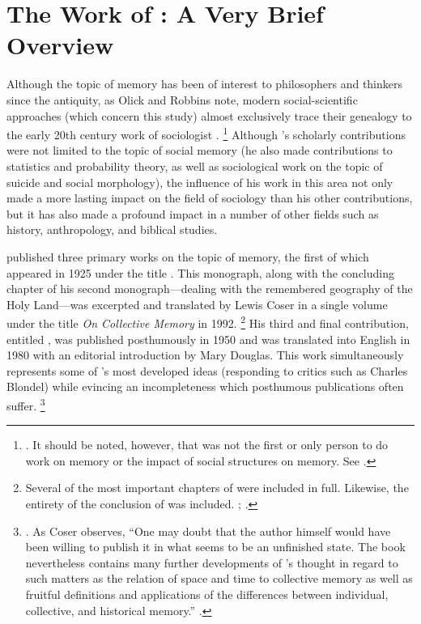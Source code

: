 
\section{The Work of \Halbwachs: A Very Brief Overview}

Although the topic of memory has been of interest to philosophers and thinkers since the antiquity,\autocite{carruthers_radstone-schwarz2011} as Olick and Robbins note, modern social-scientific approaches (which concern this study) almost exclusively trace their genealogy to the early 20th century work of sociologist \Halbwachs.%
%
\footnote{\cites[106]{olick-robbins_ars1998}. It should be noted, however, that \halbwachs was not the first or only person to do work on memory or the impact of social structures on memory. See \cite[8--36]{olick_olick-etal2011}.}
%
Although \halbwachs's scholarly contributions were not limited to the topic of social memory (he also made contributions to statistics and probability theory, as well as sociological work on the topic of suicide and social morphology), the influence of his work in this area not only made a more lasting impact on the field of sociology than his other contributions, but it has also made a profound impact in a number of other fields such as history, anthropology, and biblical studies.\autocite[13--20]{coser_halbwachs1992}

\halbwachs published three primary works on the topic of memory, the first of which appeared in 1925 under the title .\autocite{halbwachs1925} This monograph, along with the concluding chapter of his second monograph---dealing with the remembered geography of the Holy Land---was excerpted and translated by Lewis Coser in a single volume under the title \emph{On Collective Memory} in 1992.%
%
\footnote{Several of the most important chapters of  were included in full. Likewise, the entirety of the conclusion of  was included. \cites{halbwachs1992}; \cite{halbwachs1941}.}
%
His third and final contribution, entitled , was published posthumously in 1950 and was translated into English in 1980 with an editorial introduction by Mary Douglas.\autocite{halbwachs1980} This work simultaneously represents some of \halbwachs's most developed ideas (responding to critics such as Charles Blondel) while evincing an incompleteness which posthumous publications often suffer.%
%
\footnote{%
\Cite{halbwachs1980}. As Coser observes, ``One may doubt that the author himself would have been willing to publish it in what seems to be an unfinished state. The book nevertheless contains many further developments of \halbwachs's thought in regard to such matters as the relation of space and time to collective memory as well as fruitful definitions and applications of the differences between individual, collective, and historical memory.'' \cite[2]{coser_halbwachs1992}.}

